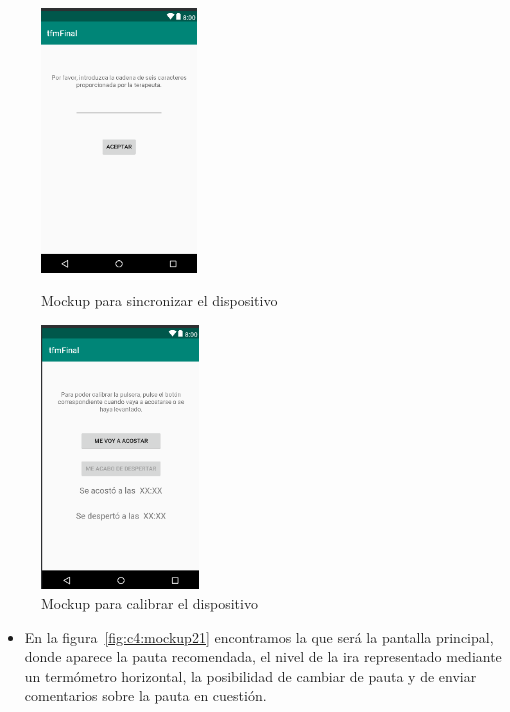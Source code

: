 \begin{figure}[h]
    \centering
    \begin{minipage}{.45\textwidth}
        \centering
        \includegraphics[width=0.8\linewidth, height=7cm]{Imagenes/anxA12.png}
        \caption[Mockup para sincronizar el dispositivo]{Mockup para sincronizar el dispositivo}
        \label{fig:c4:mockup21}
    \end{minipage}
    \hfill\vline\hfill
    \begin{minipage}{.45\textwidth}
        \centering
        \includegraphics[width=0.8\linewidth, height=7cm]{Imagenes/anxA13.png}
        \caption[Mockup para calibrar el dispositivo]{Mockup para calibrar el dispositivo}
        \label{fig:c4:mockup22}
    \end{minipage}
\end{figure}

\begin{itemize}
    \item En la figura~\ref{fig:c4:mockup21} encontramos la que será la pantalla principal, donde aparece la pauta recomendada, el nivel de la ira representado mediante un termómetro horizontal, la posibilidad de cambiar de pauta y de enviar comentarios sobre la pauta en cuestión.
\end{itemize}

